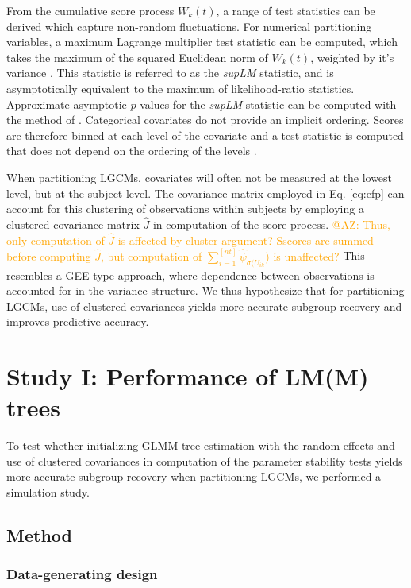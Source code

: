 \documentclass[doc,floatsintext,natbib]{apa7}
\begin{document}
From the cumulative score process $W_k(t)$, a range of test statistics can be derived which capture non-random fluctuations. For numerical partitioning variables, a maximum Lagrange multiplier test statistic can be computed, which takes the maximum of the squared Euclidean norm of $W_k(t)$, weighted by it's variance \citep{ZeilyHorn07}. This statistic is referred to as the \textit{supLM} statistic, and is asymptotically equivalent to the maximum of likelihood-ratio statistics. Approximate asymptotic $p$-values for the \textit{supLM} statistic can be computed with the method of \cite{Hans97}. Categorical covariates do not provide an implicit ordering. Scores are therefore binned at each level of the covariate and a test statistic is computed that does not depend on the ordering of the levels \citep{MerkyFan14}. 

When partitioning LGCMs, covariates will often not be measured at the lowest level, but at the subject level. The covariance matrix employed in Eq. \ref{eq:efp} can account for this clustering of observations within subjects \citep[e.g., ][]{ZeilyKoll20} by employing a clustered covariance matrix $\hat{J}$ in computation of the score process. \textcolor{orange}{@AZ: Thus, only computation of $\hat{J}$ is affected by cluster argument? Sscores are summed before computing $\hat{J}$, but computation of $\sum^{[nt]}_{i=1}{\hat{\psi}}_{\sigma(U_{ik}})$ is unaffected?} This resembles a GEE-type approach, where dependence between observations is accounted for in the variance structure. We thus hypothesize that for partitioning LGCMs, use of clustered covariances yields more accurate subgroup recovery and improves predictive accuracy.




\section{Study I: Performance of LM(M) trees}

To test whether initializing GLMM-tree estimation with the random effects and use of clustered covariances in computation of the parameter stability tests yields more accurate subgroup recovery when partitioning LGCMs, we performed a simulation study.

\subsection{Method}

\subsubsection{Data-generating design}
\end{document}
